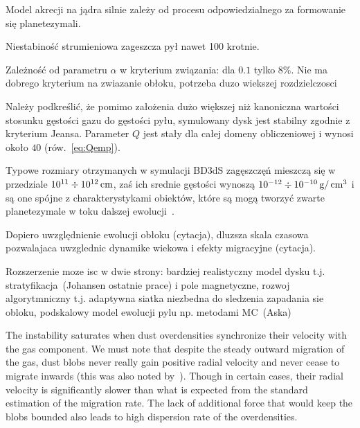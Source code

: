 Model akrecji na jądra silnie zależy od procesu odpowiedzialnego za formowanie
się planetezymali.


Niestabiność strumieniowa zageszcza pył nawet 100 krotnie.


Zależność od parametru $\alpha$ w kryterium związania: dla $0.1$ tylko $8\%$.
Nie ma dobrego kryterium na zwiazanie obłoku, potrzeba duzo wiekszej rozdzielczosci


Należy podkreślić, że pomimo założenia dużo większej niż kanoniczna wartości
stosunku gęstości gazu do gęstości pyłu, symulowany dysk jest stabilny zgodnie z
kryterium Jeansa.  Parameter $Q$ jest stały dla całej domeny obliczeniowej i
wynosi około $40$ (rów.~\ref{eq:Qemp}).

\par Typowe rozmiary otrzymanych w symulacji BD3dS zagęszczęń mieszczą się w
przedziale $10^{11} \div 10^{12}\hbox{$\thinspace\textrm{cm}$}$, zaś ich srednie gęstości wynoszą $10^{-12}
\div 10^{-10}\hbox{$\thinspace\textrm{g}$}/\hbox{$\thinspace\textrm{cm}$}^3$ i są one spójne z charakterystykami obiektów, które są
mogą tworzyć zwarte planetezymale w toku dalszej ewolucji~\cite{HS08}.

Dopiero uwzględnienie ewolucji obłoku (cytacja), dluzsza skala czasowa
pozwalajaca uwzglednic dynamike wiekowa i efekty migracyjne (cytacja).

Rozszerzenie moze isc w dwie strony: bardziej realistyczny model dysku t.j.
stratyfikacja~(Johansen ostatnie prace) i pole magnetyczne, rozwoj
algorytmniczny t.j. adaptywna siatka niezbedna do sledzenia zapadania sie
obloku, podskalowy model ewolucji pylu np.  metodami MC~(Aska)

\par The instability saturates when dust overdensities synchronize their
velocity with the gas component. We must note that despite the steady outward
migration of the gas, dust blobs never really gain positive radial velocity and
never cease to migrate inwards (this was also noted by~\cite{JY07}). Though in
certain cases, their radial velocity is significantly slower than what is
expected from the standard estimation of the migration rate. The lack of
additional force that would keep the blobs bounded also leads to high dispersion
rate of the overdensities.

